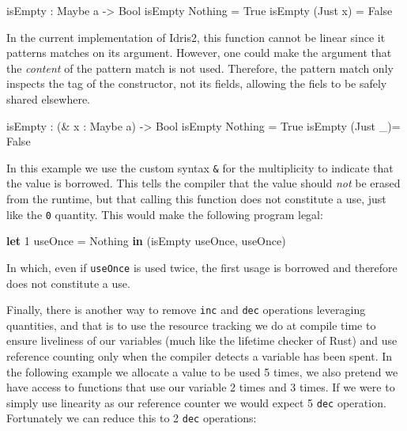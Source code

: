 \documentclass[
]{article}
\newenvironment{Shaded}{}{}
\newcommand{\DataTypeTok}[1]{\textcolor[rgb]{0.56,0.13,0.00}{#1}}
\newcommand{\DecValTok}[1]{\textcolor[rgb]{0.25,0.63,0.44}{#1}}
\newcommand{\KeywordTok}[1]{\textcolor[rgb]{0.00,0.44,0.13}{\textbf{#1}}}
\newcommand{\NormalTok}[1]{#1}
\newcommand{\OperatorTok}[1]{\textcolor[rgb]{0.40,0.40,0.40}{#1}}
\newcommand{\OtherTok}[1]{\textcolor[rgb]{0.00,0.44,0.13}{#1}}
\begin{document}
\begin{Shaded}
\begin{Highlighting}[]
\NormalTok{isEmpty }\OperatorTok{:} \DataTypeTok{Maybe}\NormalTok{ a }\OtherTok{{-}\textgreater{}} \DataTypeTok{Bool}
\NormalTok{isEmpty }\DataTypeTok{Nothing} \OtherTok{=} \DataTypeTok{True}
\NormalTok{isEmpty (}\DataTypeTok{Just}\NormalTok{ x) }\OtherTok{=} \DataTypeTok{False}
\end{Highlighting}
\end{Shaded}

In the current implementation of Idris2, this function cannot be linear
since it patterns matches on its argument. However, one could make the
argument that the \emph{content} of the pattern match is not used.
Therefore, the pattern match only inspects the tag of the constructor,
not its fields, allowing the fiels to be safely shared elsewhere.

\begin{Shaded}
\begin{Highlighting}[]
\NormalTok{isEmpty }\OperatorTok{:}\NormalTok{ (}\OperatorTok{\&}\NormalTok{ x }\OperatorTok{:} \DataTypeTok{Maybe}\NormalTok{ a) }\OtherTok{{-}\textgreater{}} \DataTypeTok{Bool}
\NormalTok{isEmpty }\DataTypeTok{Nothing} \OtherTok{=} \DataTypeTok{True}
\NormalTok{isEmpty (}\DataTypeTok{Just}\NormalTok{ \_)}\OtherTok{=} \DataTypeTok{False}
\end{Highlighting}
\end{Shaded}

In this example we use the custom syntax \texttt{\&} for the
multiplicity to indicate that the value is borrowed. This tells the
compiler that the value should \emph{not} be erased from the runtime,
but that calling this function does not constitute a use, just like the
\texttt{0} quantity. This would make the following program legal:

\begin{Shaded}
\begin{Highlighting}[]
\KeywordTok{let} \DecValTok{1}\NormalTok{ useOnce }\OtherTok{=} \DataTypeTok{Nothing} \KeywordTok{in}
\NormalTok{    (isEmpty useOnce, useOnce)}
\end{Highlighting}
\end{Shaded}

In which, even if \texttt{useOnce} is used twice, the first usage is
borrowed and therefore does not constitute a use.

Finally, there is another way to remove \texttt{inc} and \texttt{dec}
operations leveraging quantities, and that is to use the resource
tracking we do at compile time to ensure liveliness of our variables
(much like the lifetime checker of Rust) and use reference counting only
when the compiler detects a variable has been spent. In the following
example we allocate a value to be used 5 times, we also pretend we have
access to functions that use our variable 2 times and 3 times. If we
were to simply use linearity as our reference counter we would expect 5
\texttt{dec} operation. Fortunately we can reduce this to 2 \texttt{dec}
operations:
\end{document}
